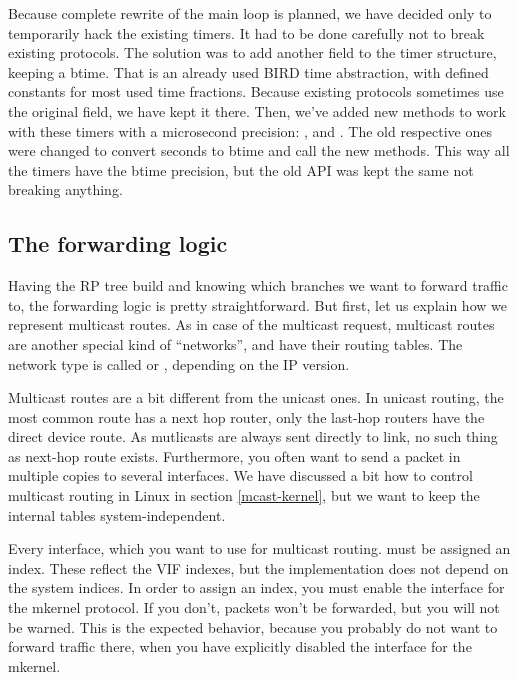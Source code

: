 Because complete rewrite of the main loop is planned, we have decided only to
temporarily hack the existing timers. It had to be done carefully not to break
existing protocols. The solution was to add another field to the timer
structure, keeping a btime. That is an already used BIRD time abstraction, with
defined constants for most used time fractions. Because existing protocols
sometimes use the original field, we have kept it there. Then, we've added new
methods to work with these timers with a microsecond precision:
,  and
. The old respective ones were changed
to convert seconds to btime and call the new methods. This way all the timers
have the btime precision, but the old API was kept the same not breaking
anything.

\subsection{The forwarding logic}
Having the RP tree build and knowing which branches we want to forward traffic
to, the forwarding logic is pretty straightforward. But first, let us explain
how we represent multicast routes. As in case of the multicast request,
multicast routes are another special kind of ``networks'', and have their
routing tables. The network type is called  or ,
depending on the IP version.

Multicast routes are a bit different from the unicast ones. In unicast routing,
the most common route has a next hop router, only the last-hop routers have the
direct device route. As mutlicasts are always sent directly to link, no such
thing as next-hop route exists. Furthermore, you often want to send a packet in
multiple copies to several interfaces. We have discussed a bit how to control
multicast routing in Linux in section \ref{mcast-kernel}, but we want to keep
the internal tables system-independent.

Every interface, which you want to use for multicast routing. must be assigned
an index. These reflect the VIF indexes, but the implementation does not depend
on the system indices. In order to assign an index, you must enable the
interface for the mkernel protocol. If you don't, packets won't be
forwarded, but you will not be warned. This is the expected behavior, because
you probably do not want to forward traffic there, when you have explicitly
disabled the interface for the mkernel.

